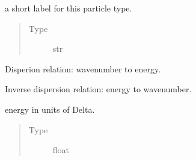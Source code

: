 \documentclass[letterpaper,10pt,english]{sphinxmanual}
\begin{document}
\begin{fulllineitems}
\begin{fulllineitems}
\end{fulllineitems}


\begin{fulllineitems}
\label{\detokenize{code_structure:scdc.particle.Particle.shortname}}
a short label for this particle type.
\begin{quote}\begin{description}
\item[{Type}] \leavevmode
str

\end{description}\end{quote}

\end{fulllineitems}


\begin{fulllineitems}
\label{\detokenize{code_structure:scdc.particle.Particle.dispersion}}
Disperion relation: wavenumber to energy.

\end{fulllineitems}


\begin{fulllineitems}
\label{\detokenize{code_structure:scdc.particle.Particle.dispersion_inverse}}
Inverse dispersion relation: energy to wavenumber.

\end{fulllineitems}


\begin{fulllineitems}
\label{\detokenize{code_structure:id0}}
energy in units of Delta.
\begin{quote}\begin{description}
\item[{Type}] \leavevmode
float


\end{description}
\end{quote}
\end{fulllineitems}
\end{fulllineitems}
\end{document}
